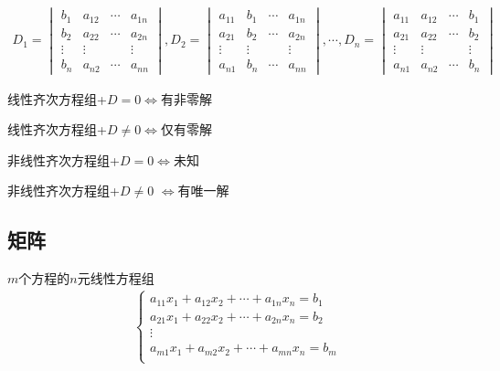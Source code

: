 \documentclass[12pt]{book}
\begin{document}
\begin{gather*}
    D_1 = \begin{vmatrix}
        b_{1}  & a_{12} & \cdots & a_{1n} \\
        b_{2}  & a_{22} & \cdots & a_{2n} \\
        \vdots & \vdots &        & \vdots \\
        b_{n}  & a_{n2} & \cdots & a_{nn} 
    \end{vmatrix},
    D_2 = \begin{vmatrix}
        a_{11} & b_{1}  & \cdots & a_{1n} \\
        a_{21} & b_{2}  & \cdots & a_{2n} \\
        \vdots & \vdots &        & \vdots \\
        a_{n1} & b_{n}  & \cdots & a_{nn} 
    \end{vmatrix},
    \cdots ,
    D_n = \begin{vmatrix}
        a_{11} & a_{12} & \cdots & b_{1}  \\
        a_{21} & a_{22} & \cdots & b_{2}  \\
        \vdots & \vdots &        & \vdots \\
        a_{n1} & a_{n2} & \cdots & b_{n}  
    \end{vmatrix}
\end{gather*}


\par 线性齐次方程组+$D=0$$\Leftrightarrow $有非零解
\par 线性齐次方程组+$D\neq 0$$\Leftrightarrow $仅有零解
\par 非线性齐次方程组+$D=0$$\Leftrightarrow $未知
\par 非线性齐次方程组+$D \neq 0$ $\Leftrightarrow$有唯一解










\subsection{矩阵}




$m$个方程的$n$元线性方程组
\begin{gather*}
    \begin{cases}
       a_{11} x_{1} + a_{12} x_{2} + \cdots + a_{1n} x_{n} = b_{1} \\
       a_{21} x_{1} + a_{22} x_{2} + \cdots + a_{2n} x_{n} = b_{2} \\
       \vdots \\
       a_{m1} x_{1} + a_{m2} x_{2} + \cdots + a_{mn} x_{n} = b_{m} \\
    \end{cases}
\end{gather*}
\end{document}
